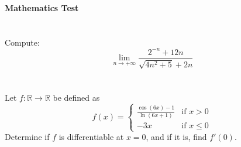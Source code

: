 \documentclass[12pt]{article}
\begin{document}
	
	\begin{center}
		\LARGE\textbf{Mathematics Test}
	\end{center}
	\vspace{1cm}
	
	\section{}
	Compute:
	\[
	\lim_{{n \to +\infty}} \frac{2^{-n} + 12n}{\sqrt{4n^2 + 5} + 2n}
	\]
	
	\section{}
	Let \( f: \mathbb{R} \to \mathbb{R} \) be defined as
	\[
	f(x) = 
	\begin{cases} 
		\frac{\cos(6x) - 1}{\ln(6x+1)} & \text{if } x > 0 \\
		-3x & \text{if } x \leq 0 
	\end{cases}
	\]
	Determine if \( f \) is differentiable at \( x = 0 \), and if it is, find \( f'(0) \).
	
\end{document}
